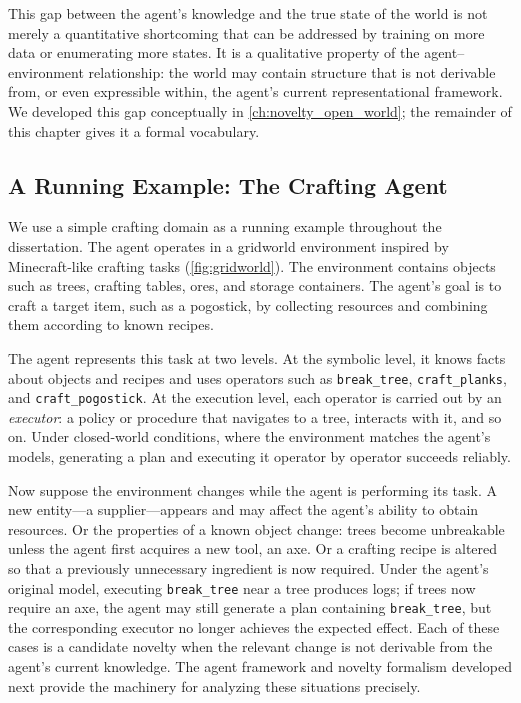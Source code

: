 This gap between the agent's knowledge and the true state of the world is not merely a quantitative shortcoming that can be addressed by training on more data or enumerating more states. It is a qualitative property of the agent--environment relationship: the world may contain structure that is not derivable from, or even expressible within, the agent's current representational framework. We developed this gap conceptually in \cref{ch:novelty_open_world}; the remainder of this chapter gives it a formal vocabulary.

\subsection{A Running Example: The Crafting Agent}
\label{sec:running_example}
\label{sec:formal_running_example}

We use a simple crafting domain as a running example throughout the dissertation. The agent operates in a gridworld environment inspired by Minecraft-like crafting tasks (\cref{fig:gridworld}). The environment contains objects such as trees, crafting tables, ores, and storage containers. The agent's goal is to craft a target item, such as a pogostick, by collecting resources and combining them according to known recipes.

The agent represents this task at two levels. At the symbolic level, it knows facts about objects and recipes and uses operators such as \texttt{break\_tree}, \texttt{craft\_planks}, and \texttt{craft\_pogostick}. At the execution level, each operator is carried out by an \emph{executor}: a policy or procedure that navigates to a tree, interacts with it, and so on. Under closed-world conditions, where the environment matches the agent's models, generating a plan and executing it operator by operator succeeds reliably.

Now suppose the environment changes while the agent is performing its task. A new entity---a supplier---appears and may affect the agent's ability to obtain resources. Or the properties of a known object change: trees become unbreakable unless the agent first acquires a new tool, an axe. Or a crafting recipe is altered so that a previously unnecessary ingredient is now required. Under the agent's original model, executing \texttt{break\_tree} near a tree produces logs; if trees now require an axe, the agent may still generate a plan containing \texttt{break\_tree}, but the corresponding executor no longer achieves the expected effect. Each of these cases is a candidate novelty when the relevant change is not derivable from the agent's current knowledge. The agent framework and novelty formalism developed next provide the machinery for analyzing these situations precisely.

